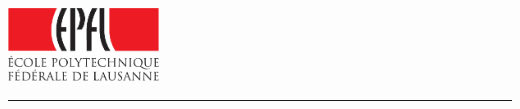 
%        




\newcommand{\logoepfl}[0]{
  \begin{center}
    \includegraphics[width=4cm]{logo_epfl_coul.pdf}
  \end{center}
  \vspace{0.3cm}
  \hrule
}
\newcommand{\logolasec}[0]{
  \vspace{1cm}
  \hrule
  \begin{center}
    \texttt{[image: logo\_lasec\_coul.eps]}
  \end{center}
}
\newcommand{\project}[1]{
  \begin{center}
    \large{#1}
  \end{center}
  \vspace{1cm}
}
\newcommand{\department}[1]{
  \begin{center}
    \large{#1}
  \end{center}
}
\newcommand{\supervisor}[3]{
  \begin{center}
    \begin{normalsize}{
        \bf #1}\\#2\\#3
    \end{normalsize}
  \end{center}
}
\renewcommand{\author}[1]{
  \begin{center}
    \Large{#1}
  \end{center}
  \vspace{0.5cm}
}
\renewcommand{\title}[1]{
  \vspace{3cm}
  \begin{center}
    \huge{#1}
  \end{center}
  \vspace{1.7cm}
}
\renewcommand{\date}[2]{
  \begin{center}
    \normalsize{#1 #2}
  \end{center}
  \vspace{0.5cm}
}


\thispagestyle{empty}


  \logoepfl

